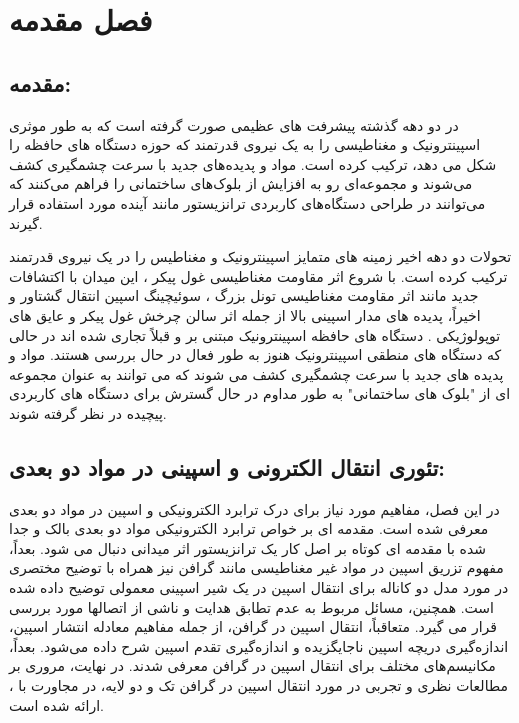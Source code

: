 ﻿\chapter{فصل مقدمه} 
\newpage
\section{مقدمه:}

در دو دهه گذشته پیشرفت های عظیمی صورت گرفته است که به طور موثری اسپینترونیک و مغناطیسی را به یک نیروی قدرتمند که حوزه دستگاه های حافظه را شکل می دهد، ترکیب کرده است. مواد و پدیده‌های جدید با سرعت چشمگیری کشف می‌شوند و مجموعه‌ای رو به افزایش از بلوک‌های ساختمانی را فراهم می‌کنند که می‌توانند در طراحی دستگاه‌های کاربردی ترانزیستور مانند آینده مورد استفاده قرار گیرند.

تحولات دو دهه اخیر زمینه های متمایز اسپینترونیک و مغناطیس را در یک نیروی قدرتمند ترکیب کرده است. با شروع اثر مقاومت مغناطیسی غول پیکر ، این میدان با اکتشافات جدید مانند اثر مقاومت مغناطیسی تونل بزرگ ، سوئیچینگ اسپین انتقال گشتاور  و اخیراً، پدیده های مدار اسپینی بالا از جمله اثر سالن چرخش غول پیکر  و عایق های توپولوژیکی .
دستگاه های حافظه اسپینترونیک مبتنی بر  و  قبلاً تجاری شده اند در حالی که دستگاه های منطقی اسپینترونیک هنوز به طور فعال در حال بررسی هستند. مواد و پدیده های جدید با سرعت چشمگیری کشف می شوند که می توانند به عنوان مجموعه ای از "بلوک های ساختمانی" به طور مداوم در حال گسترش برای دستگاه های کاربردی پیچیده در نظر گرفته شوند.

\section{تئوری انتقال الکترونی و اسپینی در مواد دو بعدی:}
در این فصل، مفاهیم مورد نیاز برای درک ترابرد الکترونیکی و اسپین در مواد دو بعدی معرفی شده است. مقدمه ای بر خواص ترابرد الکترونیکی مواد دو بعدی بالک و جدا شده با مقدمه ای کوتاه بر اصل کار یک ترانزیستور اثر میدانی دنبال می شود. بعداً، مفهوم تزریق اسپین در مواد غیر مغناطیسی مانند گرافن نیز همراه با توضیح مختصری در مورد مدل دو کاناله برای انتقال اسپین در یک شیر اسپینی معمولی توضیح داده شده است. همچنین، مسائل مربوط به عدم تطابق هدایت و  ناشی از اتصالها مورد بررسی قرار می گیرد. متعاقباً، انتقال اسپین در گرافن، از جمله مفاهیم معادله انتشار اسپین، اندازه‌گیری دریچه اسپین ناجایگزیده و اندازه‌گیری تقدم اسپین  شرح داده می‌شود. بعداً، مکانیسم‌های مختلف  برای انتقال اسپین در گرافن معرفی شدند. در نهایت، مروری بر مطالعات نظری و تجربی در مورد انتقال اسپین در گرافن تک و دو لایه، در مجاورت با ، ارائه شده است.

